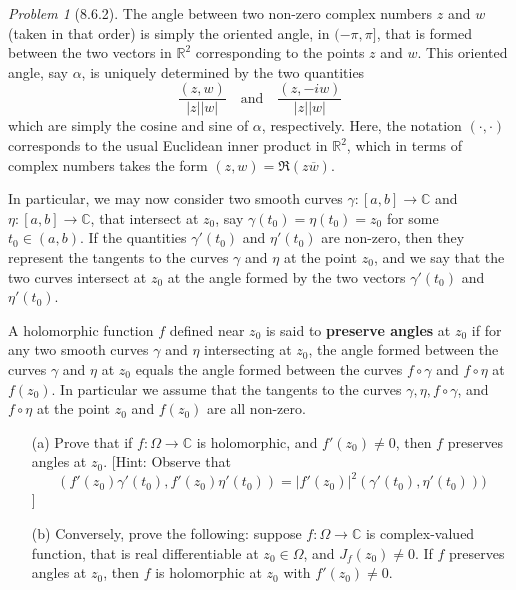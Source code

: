 \documentclass[10pt]{article}
\newcommand{\bb}[1]{\mathbb{#1}}
\newcommand{\conj}[1]{\overline{#1}}
\theoremstyle{remark}
\newtheorem{problem}{Problem}
\theoremstyle{remark}
\begin{document}
\begin{problem}[8.6.2]
  The angle between two non-zero complex numbers $z$ and $w$ (taken in that
  order) is simply the oriented angle, in $(-\pi,\pi]$, that is formed between
  the two vectors in $\bb{R}^2$ corresponding to the points $z$ and $w$. This
  oriented angle, say $\alpha$, is uniquely determined by the two quantities
  \[
    \frac{(z,w)}{|z||w|}\quad\text{and}\quad \frac{(z,-iw)}{|z||w|}
  \]
  which are simply the cosine and sine of $\alpha$, respectively. Here, the
  notation $(\cdot,\cdot)$ corresponds to the usual Euclidean inner product in
  $\bb{R}^2$, which in terms of complex numbers takes the form
  $(z,w)=\Re(z\conj{w})$.

  In particular, we may now consider two smooth curves
  $\gamma:[a,b]\rightarrow\bb{C}$ and $\eta:[a,b]\rightarrow\bb{C}$, that
  intersect at $z_0$, say $\gamma(t_0)=\eta(t_0)=z_0$ for some
  $t_0\in(a,b)$. If the quantities $\gamma'(t_0)$ and $\eta'(t_0)$ are
  non-zero, then they represent the tangents to the curves $\gamma$ and
  $\eta$ at the point $z_0$, and we say that the two curves intersect at
  $z_0$ at the angle formed by the two vectors $\gamma'(t_0)$ and $\eta'(t_0)$.

  A holomorphic function $f$ defined near $z_0$ is said to
  \textbf{preserve angles} at $z_0$ if for any two smooth curves $\gamma$ and
  $\eta$ intersecting at $z_0$, the angle formed between the curves $\gamma$ and
  $\eta$ at $z_0$ equals the angle formed between the curves $f\circ\gamma$
  and $f\circ\eta$ at $f(z_0)$. In particular we assume that the tangents to
  the curves $\gamma,\eta,f\circ\gamma$, and $f\circ\eta$ at the point $z_0$ and
  $f(z_0)$ are all non-zero.
  \begin{enumerate}
  \item[(a)] Prove that if $f:\Omega\rightarrow\bb{C}$ is holomorphic, and
    $f'(z_0)\neq 0$, then $f$ preserves angles at $z_0$. [Hint: Observe that
    \[
      (f'(z_0)\gamma'(t_0),f'(z_0)\eta'(t_0))=|f'(z_0)|^2(\gamma'(t_0),\eta'(t_0)))
    \]
      ]
    \item[(b)] Conversely, prove the following: suppose
      $f:\Omega\rightarrow\bb{C}$ is complex-valued function, that is real
      differentiable at $z_0\in\Omega$, and $J_f(z_0)\neq 0$. If $f$ preserves
      angles at $z_0$, then $f$ is holomorphic at $z_0$ with $f'(z_0)\neq 0$.
  \end{enumerate}
\end{problem}
\end{document}
